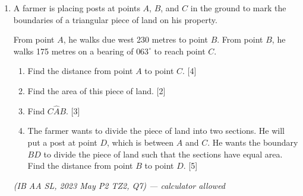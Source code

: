 \documentclass[12pt, twoside]{article}
\begin{document}
\begin{enumerate}[itemsep=0.5cm]
\newpage
\item A farmer is placing posts at points $A$, $B$, and $C$ in the ground to mark the boundaries of a triangular piece of land on his property.

From point $A$, he walks due west 230 metres to point $B$. From point $B$, he walks 175 metres on a bearing of $063^\circ$ to reach point $C$.

    \begin{enumerate}[itemsep=0.15cm]
        \item Find the distance from point $A$ to point $C$. \hfill [4]
        \item Find the area of this piece of land. \hfill [2]
        \item Find $C\hat{A}B$. \hfill [3]
        \item The farmer wants to divide the piece of land into two sections. He will put a post at point $D$, which is between $A$ and $C$. He wants the boundary $BD$ to divide the piece of land such that the sections have equal area. Find the distance from point $B$ to point $D$. \hfill [5]
    \end{enumerate}

    \hfill \textit{(IB AA SL, 2023 May P2 TZ2, Q7) --- calculator allowed}

\end{enumerate}
\end{document}
